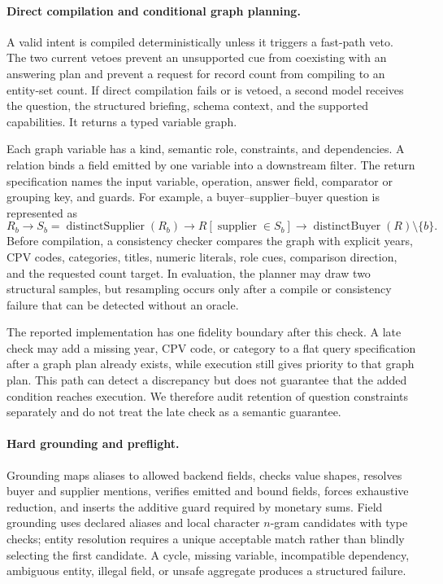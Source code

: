 \paragraph{Direct compilation and conditional graph planning.}
A valid intent is compiled deterministically unless it triggers a fast-path veto.  The two current
vetoes prevent an unsupported cue from coexisting with an answering plan and prevent a request for
record count from compiling to an entity-set count.  If direct compilation fails or is vetoed, a
second model receives the question, the structured briefing, schema context, and the supported
capabilities.  It returns a typed variable graph.

Each graph variable has a kind, semantic role, constraints, and dependencies.  A relation binds a
field emitted by one variable into a downstream filter.  The return specification names the input
variable, operation, answer field, comparator or grouping key, and guards.  For example, a
buyer--supplier--buyer question is represented as
\[
 R_b \longrightarrow S_b=\operatorname{distinctSupplier}(R_b)
 \longrightarrow R[\operatorname{supplier}\in S_b]
 \longrightarrow \operatorname{distinctBuyer}(R)\setminus\{b\}.
\]
Before compilation, a consistency checker compares the graph with explicit years, CPV codes,
categories, titles, numeric literals, role cues, comparison direction, and the requested count
target.  In evaluation, the planner may draw two structural samples, but resampling occurs only
after a compile or consistency failure that can be detected without an oracle.

The reported implementation has one fidelity boundary after this check.  A late check may add a
missing year, CPV code, or category to a flat query specification after a graph plan already exists,
while execution still gives priority to that graph plan.  This path can detect a discrepancy but
does not guarantee that the added condition reaches execution.  We therefore audit retention of
question constraints separately and do not treat the late check as a semantic guarantee.

\paragraph{Hard grounding and preflight.}
Grounding maps aliases to allowed backend fields, checks value shapes, resolves buyer and supplier
mentions, verifies emitted and bound fields, forces exhaustive reduction, and inserts the additive
guard required by monetary sums.  Field grounding uses declared aliases and local character
$n$-gram candidates with type checks; entity resolution requires a unique acceptable match rather
than blindly selecting the first candidate.  A cycle, missing variable, incompatible dependency,
ambiguous entity, illegal field, or unsafe aggregate produces a structured failure.


